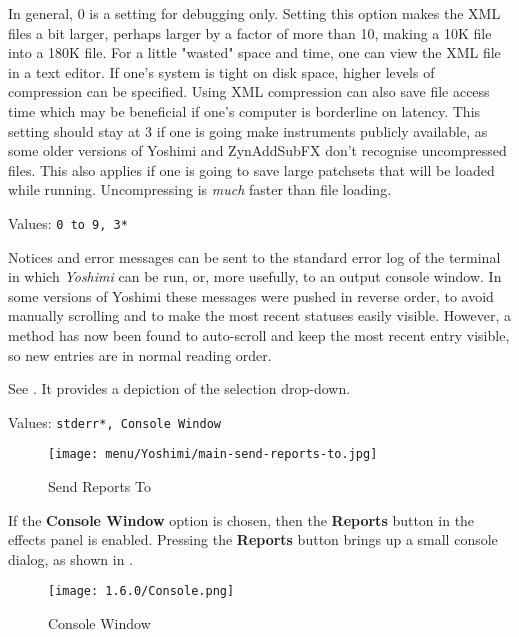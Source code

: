    In general, 0 is a setting for debugging only.  Setting this
   option makes the XML files a bit larger, perhaps larger by a factor of more
   than 10, making a 10K file into a 180K file.  For a little "wasted" space
   and time, one can view the XML file in a text editor.  If
   one's system is tight on disk space, higher levels of compression can be
   specified.  Using XML compression can also save file access time which may
   be beneficial if one's computer is borderline on latency.  This setting
   should stay at 3 if one is going make instruments publicly available, as
   some older versions of Yoshimi and ZynAddSubFX don't recognise uncompressed
   files. This also applies if one is going to save large patchsets that will
   be loaded while running. Uncompressing is \textsl{much} faster than file
   loading.

   Values: \texttt{0 to 9, 3*}

   Notices and error messages can be sent to the standard error log of
   the terminal in which
   \textsl{Yoshimi} can be run, or, more usefully, to
   an output console window.
   In some versions of Yoshimi these messages were pushed in reverse order, to
   avoid manually scrolling and to make the most recent statuses easily visible.
   However, a method has now been found to auto-scroll and keep the most recent
   entry visible, so new entries are in normal reading order.

   See .
   It provides a depiction of the selection drop-down.

   Values: \texttt{stderr*, Console Window}

\begin{figure}[H]
   \centering
   \texttt{[image: menu/Yoshimi/main-send-reports-to.jpg]}
   \caption[Send Reports]{Send Reports To}
   \label{fig:send_reports_to}
\end{figure}

   If the \textbf{Console Window} option is chosen, then the
   \textbf{Reports} button in the effects panel is enabled.
   Pressing the \textbf{Reports} button brings up a small console dialog, as
   shown in .

\begin{figure}[H]
   \centering
   \texttt{[image: 1.6.0/Console.png]}
   \caption[Yoshimi Console Window]{Console Window}
   \label{fig:console_window}
\end{figure}

